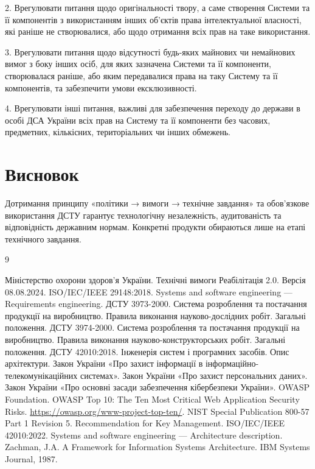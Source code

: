 \documentclass{article}
\begin{document}
2. Врегулювати питання щодо оригінальності твору, а саме створення Системи та її компонентів з використанням інших об’єктів права інтелектуальної власності, які раніше не створювалися, або щодо отримання всіх прав на таке використання.

3. Врегулювати питання щодо відсутності будь-яких майнових чи немайнових вимог з боку інших осіб, для яких зазначена Системи та її компоненти, створювалася раніше, або яким передавалися права на таку Систему та її компонентів, та забезпечити умови ексклюзивності.

4. Врегулювати інші питання, важливі для забезпечення переходу до держави в особі ДСА України всіх прав на Систему та її компоненти  без часових, предметних, кількісних, територіальних чи інших обмежень.

\newpage
\section*{Висновок}

Дотримання принципу «політики → вимоги → технічне завдання» та обов’язкове використання ДСТУ гарантує технологічну незалежність, аудитованість та відповідність державним нормам. Конкретні продукти обираються лише на етапі технічного завдання.

\begin{thebibliography}{9}

 Міністерство охорони здоров’я України. \newblock Технічні вимоги Реабілітація 2.0. \newblock Версія 08.08.2024.
 ISO/IEC/IEEE 29148:2018. Systems and software engineering — Requirements engineering.
 ДСТУ 3973-2000. \newblock Система розроблення та постачання продукції на виробництво. Правила виконання науково-дослідних робіт. Загальні положення.
 ДСТУ 3974-2000. \newblock Система розроблення та постачання продукції на виробництво. Правила виконання науково-конструкторських робіт. Загальні положення.
 ДСТУ 42010:2018. \newblock Інженерія систем і програмних засобів. Опис архітектури.
 Закон України «Про захист інформації в інформаційно-телекомунікаційних системах».
 Закон України «Про захист персональних даних».
 Закон України «Про основні засади забезпечення кібербезпеки України».
 OWASP Foundation. \newblock OWASP Top 10: The Ten Most Critical Web Application Security Risks. \newblock \url{https://owasp.org/www-project-top-ten/}.
 NIST Special Publication 800-57 Part 1 Revision 5. \newblock Recommendation for Key Management.
 ISO/IEC/IEEE 42010:2022. \newblock Systems and software engineering — Architecture description.
 Zachman, J.A. \newblock A Framework for Information Systems Architecture. \newblock IBM Systems Journal, 1987.

\end{thebibliography}
\end{document}
